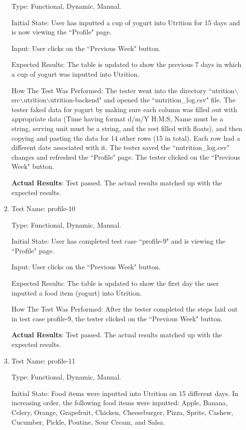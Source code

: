 \documentclass[12pt, titlepage]{article}
\begin{document}
\begin{enumerate}
		Type: Functional, Dynamic, Manual.
		
		Initial State: User has inputted a cup of yogurt into Utrition for 15 days and is now viewing the ``Profile" page.
		
		Input: User clicks on the ``Previous Week" button.
		
		Expected Results: The table is updated to show the previous 7 days in which a cup of yogurt was inputted into Utrition. 
		
		How The Test Was Performed: The tester went into the directory ``utrition$\backslash$src$\backslash$utrition$\backslash$utrition-backend" and opened the ``nutrition\_log.csv" file. The tester faked data for yogurt by making sure each column was filled out with appropriate data (Time having format d/m/Y H:M:S, Name must be a string, serving unit must be a string, and the rest filled with floats), and then copying and pasting the data for 14 other rows (15 in total). Each row had a different date associated with it. The tester saved the ``nutrition\_log.csv" changes and refreshed the ``Profile" page. The tester clicked on the ``Previous Week" button.
		
		\textbf{Actual Results}: Test passed. The actual results matched up with the expected results.
		
		\item{Test Name: profile-10}
		
		Type: Functional, Dynamic, Manual.
		
		Initial State: User has completed test case ``profile-9" and is viewing the ``Profile" page.
		
		Input: User clicks on the ``Previous Week" button.
		
		Expected Results: The table is updated to show the first day the user inputted a food item (yogurt) into Utrition.
		
		How The Test Was Performed: After the tester completed the steps laid out in test case profile-9, the tester clicked on the ``Previous Week" button.
		
		\textbf{Actual Results}: Test passed. The actual results matched up with the expected results.
		
		\item{Test Name: profile-11}
		
		Type: Functional, Dynamic, Manual.
		
		Initial State: Food items were inputted into Utrition on 15 different days. In increasing order, the following food items were inputted: Apple, Banana, Celery, Orange, Grapefruit, Chicken, Cheeseburger, Pizza, Sprite, Cashew, Cucumber, Pickle, Poutine, Sour Cream, and Salsa.
		

\end{enumerate}
\end{document}
